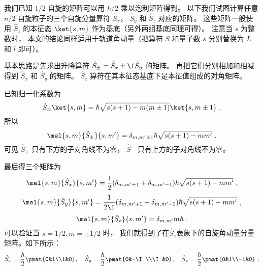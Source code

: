 

我们已知 $1/2$ 自旋的矩阵可以用 $\hbar/2$ 乘以泡利矩阵得到。 以下我们试图计算任意 $n/2$ 自旋粒子的三个自旋分量算符 $\hat S_x$， $\hat S_y$ 和 $\hat S_z$ 对应的矩阵。 这些矩阵一般使用 $\hat S_z$ 的本征态 $\ket{s, m}$ 作为基底（另外两组基底同理可得）。 注意当 $s$ 为整数时， 本文的结论同样适用于轨道角动量（把算符 $S$ 和量子数 $s$ 分别替换为 $L$ 和 $l$ 即可）。

基本思路是先求出升降算符 $\hat S_\pm = \hat S_x \pm \I \hat S_y$ 的矩阵。 再把它们分别相加和相减得到 $\hat S_x$ 和 $\hat S_y$ 的矩阵。 $\hat S_z$ 算符在其本征态基底下是本征值组成的对角矩阵。

已知归一化系数为
\begin{equation}
\hat S_\pm \ket{s,m} = \hbar \sqrt{s(s + 1) - m(m \pm 1)} \ket{s,m\pm1}~,
\end{equation}
所以
\begin{equation}
\mel{s,m}{\hat S_\pm}{s,m'} = \delta_{m, m'\pm1} \hbar \sqrt{s(s + 1) - mm'}~.
\end{equation}
可见 $\hat S_+$ 只有下方的子对角线不为零， $\hat S_-$ 只有上方的子对角线不为零。

最后得三个矩阵为
\begin{equation}
\mel{s,m}{\hat S_x}{s,m'} = \frac12(\delta_{m, m'+1} + \delta_{m, m'-1})\hbar \sqrt{s(s + 1) - mm'} ~,
\end{equation}
\begin{equation}
\mel{s,m}{\hat S_y}{s,m'} = \frac{1}{2\I}(\delta_{m, m'+1} - \delta_{m, m'-1}) \hbar \sqrt{s(s + 1) - mm'}~,
\end{equation}
\begin{equation}
\mel{s,m}{\hat S_z}{s,m'} = \delta_{m,m'} m\hbar ~.
\end{equation}
可以验证当 $s = 1/2, m = \pm1/2$ 时， 我们就得到了在$\hat S_z$表象下的自旋角动量分量矩阵。如下所示：
\begin{equation}\label{eq_spinMt_1}
\hat S_x=\frac{\hbar}{2}\pmat{0&1\\1&0},\quad\hat S_y=\frac{\hbar}{2}\pmat{0&-\I\\\I&0},\quad\hat S_z=\frac{\hbar}{2}\pmat{0&1\\-1&0}~.
\end{equation}

